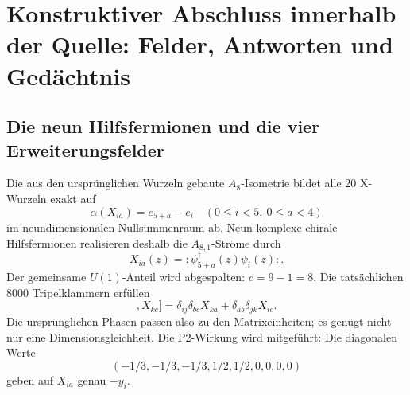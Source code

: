 \section{Konstruktiver Abschluss innerhalb der Quelle: Felder, Antworten und Gedächtnis}\label{sec:constructive}


\subsection{Die neun Hilfsfermionen und die vier Erweiterungsfelder}
Die aus den ursprünglichen Wurzeln gebaute $A_8$-Isometrie bildet alle 20 X-Wurzeln exakt auf
\begin{equation}
\alpha(X_{ia})=e_{5+a}-e_i\quad(0\le i<5,\ 0\le a<4)
\end{equation}
im neundimensionalen Nullsummenraum ab. Neun komplexe chirale Hilfsfermionen realisieren deshalb die $A_{8,1}$-Ströme durch
\begin{equation}
X_{ia}(z)=:\!\psi_{5+a}^\dagger(z)\psi_i(z)\!:.
\end{equation}
Der gemeinsame $U(1)$-Anteil wird abgespalten: $c=9-1=8$. Die tatsächlichen 8000 Tripelklammern erfüllen
\begin{equation}
[[X_{ia},X_{jb}^\dagger],X_{kc}]
=\delta_{ij}\delta_{bc}X_{ka}+\delta_{ab}\delta_{jk}X_{ic}.
\end{equation}
Die ursprünglichen Phasen passen also zu den Matrixeinheiten; es genügt nicht nur eine Dimensionsgleichheit. Die P2-Wirkung wird mitgeführt: Die diagonalen Werte
\[
(-1/3,-1/3,-1/3,1/2,1/2,0,0,0,0)
\]
geben auf $X_{ia}$ genau $-y_i$.

